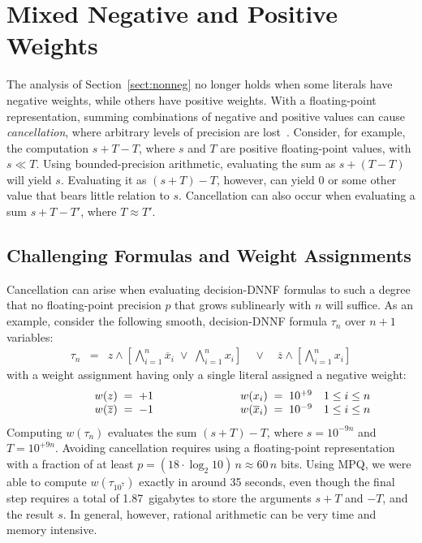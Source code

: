 \documentclass{easychair}
\newcommand{\obar}[1]{\overline{#1}}
\begin{document}
\section{Mixed Negative and Positive  Weights}
\label{sect:neg}

The analysis of Section~\ref{sect:nonneg} no longer holds when
some literals have negative weights, while others have positive weights.  With a floating-point
representation, summing combinations of negative and positive
values can cause \emph{cancellation}, where arbitrary levels of
precision are lost~\cite{knuth:fp:1981}.  Consider, for example, the computation
$s + T - T$, where $s$ and $T$ are positive floating-point values, with $s \ll T$.  Using
bounded-precision arithmetic, evaluating the sum as $s + (T - T)$ will yield $s$.
Evaluating it as $(s + T) - T$, however, can yield $0$ or some other value that bears little relation to $s$.
Cancellation can also occur when evaluating a sum $s + T - T'$, where $T \approx T'$.

\subsection{Challenging Formulas and Weight Assignments}

Cancellation can arise when evaluating decision-DNNF formulas to such a degree that no floating-point precision $p$ that grows sublinearly with $n$ will suffice.
As an example, consider the following smooth, decision-DNNF formula $\tau_n$ over $n+1$ variables:
\begin{eqnarray}
\tau_n  & = & z \land \left[\bigwedge_{i = 1}^{n} \obar{x}_i \; \lor \; \bigwedge_{i = 1}^{n} x_i\right] \quad \lor \quad \obar{z} \land \left [\bigwedge_{i = 1}^{n} x_i\right] \label{eqn:max:precision}
\end{eqnarray}
with a weight assignment having only a single literal assigned a negative weight:
\begin{displaymath}
\begin{array}{lllll}
\makebox[1cm]{} &  w(z) \; = \; +1 & \makebox[2cm]{} &  w(x_i) \; = \; 10^{+9} & 1 \leq i \leq n \\
\makebox[1cm]{} &  w(\obar{z}) \; = \; -1 & &  w(\obar{x}_i) \; = \; 10^{-9} & 1 \leq i \leq n \\
\end{array}
\end{displaymath}
Computing $w(\tau_n)$  evaluates the sum $(s + T) - T$, where
$s = 10^{-9n}$ and $T = 10^{+9n}$.  Avoiding cancellation requires using a floating-point representation with a fraction of at least
$p = (18 \cdot \log_2 10)\, n \approx 60 \, n$ bits.
Using MPQ, we were able to compute $w(\tau_{10^7})$ exactly in around 35 seconds, even though the final step requires a total of 1.87~gigabytes to store the arguments
$s+T$ and $-T$, and the result $s$.  In general, however, rational arithmetic can be very time and memory intensive.
\end{document}
